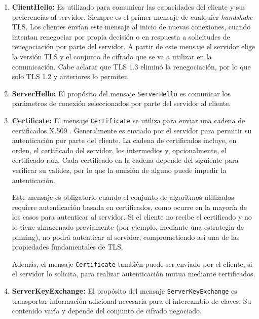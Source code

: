 \begin{enumerate}
    
    \item \textbf{ClientHello: } Es utilizado para comunicar las capacidades del cliente y sus preferencias al servidor. Siempre es el primer mensaje de cualquier \textit{handshake} TLS. Los clientes envían este mensaje al inicio de nuevas conexiones, cuando intentan renegociar por propia decisión o en respuesta a solicitudes de renegociación por parte del servidor. A partir de este mensaje el servidor elige la versión TLS y el conjunto de cifrado que se va a utilizar en la comunicación. Cabe aclarar que TLS 1.3 eliminó la renegociación, por lo que solo TLS 1.2 y anteriores lo permiten.

    \item \textbf{ServerHello: }El propósito del mensaje \texttt{ServerHello} es comunicar los parámetros de conexión seleccionados por parte del servidor al cliente.



    \item \textbf{Certificate: }El mensaje \texttt{Certificate} se utiliza para enviar una cadena de certificados X.509 \cite{housley1999rfc2459}. Generalmente es enviado por el servidor para permitir su autenticación por parte del cliente. La cadena de certificados incluye, en orden, el certificado del servidor, los intermedios y, opcionalmente, el certificado raíz. Cada certificado en la cadena depende del siguiente para verificar su validez, por lo que la omisión de alguno puede impedir la autenticación.

    Este mensaje es obligatorio cuando el conjunto de algoritmos utilizados requiere autenticación basada en certificados, como ocurre en la mayoría de los casos para autenticar al servidor. Si el cliente no recibe el certificado y no lo tiene almacenado previamente (por ejemplo, mediante una estrategia de pinning), no podrá autenticar al servidor, comprometiendo así una de las propiedades fundamentales de TLS.
    
    Además, el mensaje \texttt{Certificate} también puede ser enviado por el cliente, si el servidor lo solicita, para realizar autenticación mutua mediante certificados.


    \item \textbf{ServerKeyExchange: }El propósito del mensaje \texttt{ServerKeyExchange} es transportar información adicional necesaria para el intercambio de claves. Su contenido varía y depende del conjunto de cifrado negociado.


\end{enumerate}
